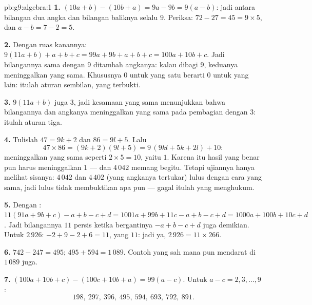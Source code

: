\begin{solution}{pb:g9:algebra:1}
\textbf{1.} $(10a + b) - (10b + a) = 9a - 9b = 9(a - b)$: jadi
 antara bilangan dua angka dan bilangan baliknya selalu
 $9$. Periksa: $72 - 27 = 45 = 9 \times 5$, dan
$a - b = 7 - 2 = 5$.

\textbf{2.} Dengan  ruas kanannya:
$9(11a + b) + a + b + c = 99a + 9b + a + b + c
= 100a + 10b + c$. Jadi bilangannya sama dengan  $9$ ditambah
 angkanya: kalau dibagi $9$, keduanya meninggalkan  yang sama.
Khususnya  $0$ untuk yang satu berarti  $0$ untuk yang
lain: itulah aturan sembilan, yang terbukti.

\textbf{3.} $9(11a + b)$ juga  $3$, jadi kesamaan yang
sama menunjukkan bahwa bilangannya dan  angkanya meninggalkan
 yang sama pada pembagian dengan $3$: itulah aturan tiga.

\textbf{4.} Tulislah $47 = 9k + 2$ dan $86 = 9l + 5$. Lalu
\[
47 \times 86 = (9k + 2)(9l + 5)
= 9\,(9kl + 5k + 2l) + 10 :
\]
 meninggalkan  yang sama seperti $2 \times 5 = 10$,
yaitu $1$. Karena itu hasil yang benar pun harus meninggalkan 
$1$ --- dan $4\,042$ memang begitu. Tetapi ujiannya hanya melihat
sisanya: $4\,042$ dan $4\,402$ (yang angkanya tertukar) lulus dengan
cara yang sama, jadi lulus tidak membuktikan apa pun --- gagal itulah
yang menghukum.

\textbf{5.} Dengan : $11(91a + 9b + c) - a + b - c + d
= 1001a + 99b + 11c - a + b - c + d
= 1000a + 100b + 10c + d$. Jadi bilangannya  $11$
persis ketika  bergantinya $-a + b - c + d$ juga demikian.
Untuk $2\,926$: $-2 + 9 - 2 + 6 = 11$, yang  $11$: jadi
ya, $2\,926 = 11 \times 266$.

\textbf{6.} $742 - 247 = 495$; $495 + 594 = 1\,089$. Contoh yang sah
mana pun mendarat di $1\,089$ juga.

\textbf{7.} $(100a + 10b + c) - (100c + 10b + a) = 99(a - c)$.
Untuk $a - c = 2, 3, \dots, 9$:
\[
198,\ 297,\ 396,\ 495,\ 594,\ 693,\ 792,\ 891 .
\]


\end{solution}
